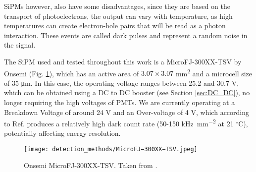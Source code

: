 SiPMs however, also have some disadvantages, since they are based on the transport of photoelectrons, the output can vary with temperature, as high temperatures can create electron-hole pairs that will be read as a photon interaction. These events are called dark pulses and represent a random noise in the signal.

The SiPM used and tested throughout this work is a MicroFJ-300XX-TSV by Onsemi \cite{Onsemi_SiPM} (Fig. \ref{fig:Onsemi_SiPM}), which has an active area of $3.07 \times 3.07$ \unit{\mm\squared} and a microcell size of 35 \unit{\micro\m}. In this case, the operating voltage ranges between 25.2 and 30.7 \unit{\V}, which can be obtained using a DC to DC booster (see Section \ref{sec:DC_DC}), no longer requiring the high voltages of PMTs. We are currently operating at a Breakdown Voltage of around 24 V and an Over-voltage of 4 V, which according to Ref. \cite{Onsemi_SiPM} produces a relatively high dark count rate (50-150 \unit{\kilo\Hz\per\mm\squared} at 21 $^\circ$C), potentially affecting energy resolution.

\begin{figure}[H]
    \centering
    \texttt{[image: detection\_methods/MicroFJ−300XX−TSV.jpeg]}
    \caption{Onsemi MicroFJ-300XX-TSV. Taken from \cite{Onsemi_SiPM}.}
    \label{fig:Onsemi_SiPM}
\end{figure}